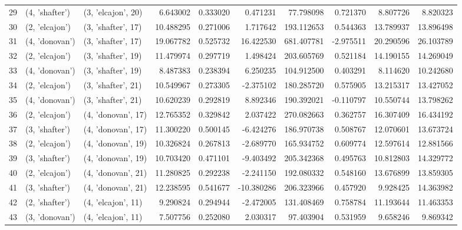 \begin{tabular}{lllrrrrrrr}
29 &   (4, 'shafter') &  (3, 'elcajon', 20) &   6.643002 &  0.333020 &   0.471231 &    77.798098 &  0.721370 &   8.807726 &   8.820323 \\
30 &   (2, 'elcajon') &  (3, 'shafter', 17) &  10.488295 &  0.271006 &   1.717642 &   193.112653 &  0.544363 &  13.789937 &  13.896498 \\
31 &   (4, 'donovan') &  (3, 'shafter', 17) &  19.067782 &  0.525732 &  16.422530 &   681.407781 & -2.975511 &  20.290596 &  26.103789 \\
32 &   (2, 'elcajon') &  (3, 'shafter', 19) &  11.479974 &  0.297719 &   1.498424 &   203.605769 &  0.521184 &  14.190155 &  14.269049 \\
33 &   (4, 'donovan') &  (3, 'shafter', 19) &   8.487383 &  0.238394 &   6.250235 &   104.912500 &  0.403291 &   8.114620 &  10.242680 \\
34 &   (2, 'elcajon') &  (3, 'shafter', 21) &  10.549967 &  0.273305 &  -2.375102 &   180.285720 &  0.575905 &  13.215317 &  13.427052 \\
35 &   (4, 'donovan') &  (3, 'shafter', 21) &  10.620239 &  0.292819 &   8.892346 &   190.392021 & -0.110797 &  10.550744 &  13.798262 \\
36 &   (2, 'elcajon') &  (4, 'donovan', 17) &  12.765352 &  0.329842 &   2.037422 &   270.082663 &  0.362757 &  16.307409 &  16.434192 \\
37 &   (3, 'shafter') &  (4, 'donovan', 17) &  11.300220 &  0.500145 &  -6.424276 &   186.970738 &  0.508767 &  12.070601 &  13.673724 \\
38 &   (2, 'elcajon') &  (4, 'donovan', 19) &  10.326824 &  0.267813 &  -2.689770 &   165.934752 &  0.609774 &  12.597614 &  12.881566 \\
39 &   (3, 'shafter') &  (4, 'donovan', 19) &  10.703420 &  0.471101 &  -9.403492 &   205.342368 &  0.495763 &  10.812803 &  14.329772 \\
40 &   (2, 'elcajon') &  (4, 'donovan', 21) &  11.280825 &  0.292238 &  -2.241150 &   192.080332 &  0.548160 &  13.676899 &  13.859305 \\
41 &   (3, 'shafter') &  (4, 'donovan', 21) &  12.238595 &  0.541677 & -10.380286 &   206.323966 &  0.457920 &   9.928425 &  14.363982 \\
42 &   (2, 'shafter') &  (4, 'elcajon', 11) &   9.290824 &  0.294944 &  -2.472005 &   131.408469 &  0.758784 &  11.193644 &  11.463353 \\
43 &   (3, 'donovan') &  (4, 'elcajon', 11) &   7.507756 &  0.252080 &   2.030317 &    97.403904 &  0.531959 &   9.658246 &   9.869342 \\

\end{tabular}
